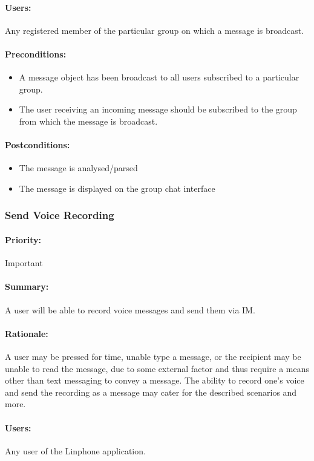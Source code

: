 \documentclass[11pt]{article}
\begin{document}
\paragraph{Users:} Any registered member of the particular group on which a message is broadcast.
\paragraph{Preconditions:} 
\begin{itemize}
\item A message object has been broadcast to all users subscribed to a particular group.
\item The user receiving an incoming message should be subscribed to the group from which the message is broadcast.
\end{itemize}
\paragraph{{Postconditions:}}
\begin{itemize}
\item The message is analysed/parsed
\item The message is displayed on the group chat interface
\end{itemize}

\subsubsection{Send Voice Recording} \label{UC-send-voice}
\paragraph{Priority:} Important
\paragraph{Summary:} A user will be able to record voice messages and send them via IM.
\paragraph{Rationale:} A user may be pressed for time, unable type a message, or the recipient may be unable to read the message, due to some external factor and thus require a means other than text messaging to convey a message. The ability to record one's voice and send the recording as a message may cater for the described scenarios and more.
\paragraph{Users:} Any user of the Linphone application.
\end{document}
